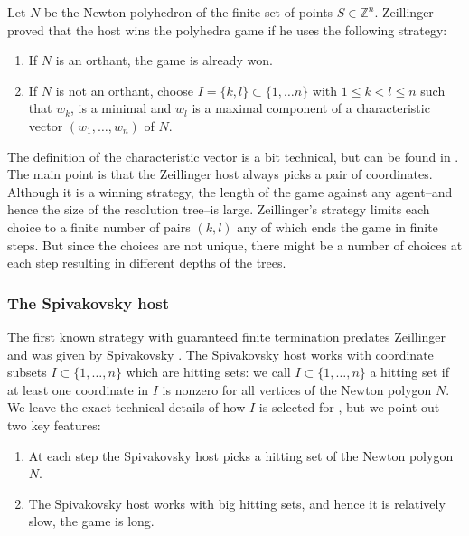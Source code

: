 \documentclass{article}
\theoremstyle{plain}
\theoremstyle{definition}
\theoremstyle{remark}
\begin{document}
Let $N$ be the Newton polyhedron of the finite set of points $S\in\mathbb Z^n$. Zeillinger proved that the host wins the polyhedra game if he uses the following strategy:
\begin{enumerate}
    \item If $N$ is an orthant, the game is already won.
    \item If $N$ is not an orthant, choose
$I=\{k,l\} \subset \{1,\ldots n\}$
with $1 \le k <l \le n$ such that $w_k$, is a minimal and $w_l$ is a maximal component of a characteristic vector $(w_1,\ldots, w_n)$ of $N$.
\end{enumerate} 
The definition of the characteristic vector is a bit technical, but can be found in \cite{zeillinger}. The main point is that the Zeillinger host always picks a pair of coordinates. Although it is a winning strategy, the length of the game against any agent--and hence the size of the resolution tree--is large. Zeillinger's strategy limits each choice to a finite number of pairs $(k,l)$ any of which ends the game in finite steps. But since the choices are not unique, there might be a number of choices at each step resulting in different depths of the trees. 

\subsubsection{The Spivakovsky host} 
The first known strategy with guaranteed finite termination predates Zeillinger and was given by Spivakovsky \cite{spivakovsky2}. The Spivakovsky host works with coordinate subsets $I \subset \{1,\ldots, n\}$ which are hitting sets: we call $I\subset \{1,\ldots, n\}$ a hitting set if at least one coordinate in $I$ is nonzero for all vertices of the Newton polygon $N$. We leave the exact technical details of how $I$ is selected for \cite{zeillinger,spivakovsky2}, but we point out two key features: 
\begin{enumerate}
    \item At each step the Spivakovsky host picks a hitting set of the Newton polygon $N$. 
    \item The Spivakovsky host works with big hitting sets, and hence it is relatively slow, the game is long. 
    \end{enumerate}
\end{document}
